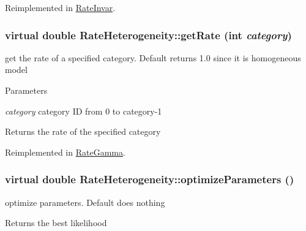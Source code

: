 Reimplemented in \hyperlink{classRateInvar_a750aa513c32453d28cc50b14bb31a9a7}{RateInvar}.\hypertarget{classRateHeterogeneity_a87546419c324a62d31055d564ea07f5e}{
\subsubsection[{getRate}]{\setlength{\rightskip}{0pt plus 5cm}virtual double RateHeterogeneity::getRate (int {\em category})}}
\label{classRateHeterogeneity_a87546419c324a62d31055d564ea07f5e}
get the rate of a specified category. Default returns 1.0 since it is homogeneous model 
\begin{DoxyParams}{Parameters}
\item[{\em category}]category ID from 0 to category-\/1 \end{DoxyParams}
\begin{DoxyReturn}{Returns}
the rate of the specified category 
\end{DoxyReturn}


Reimplemented in \hyperlink{classRateGamma_a2e459469fd578b9d5d8bb18000d9d1d9}{RateGamma}.\hypertarget{classRateHeterogeneity_a1305d5b8481dd5a2482917ddb5fe57bd}{
\subsubsection[{optimizeParameters}]{\setlength{\rightskip}{0pt plus 5cm}virtual double RateHeterogeneity::optimizeParameters ()}}
\label{classRateHeterogeneity_a1305d5b8481dd5a2482917ddb5fe57bd}
optimize parameters. Default does nothing \begin{DoxyReturn}{Returns}
the best likelihood 
\end{DoxyReturn}


